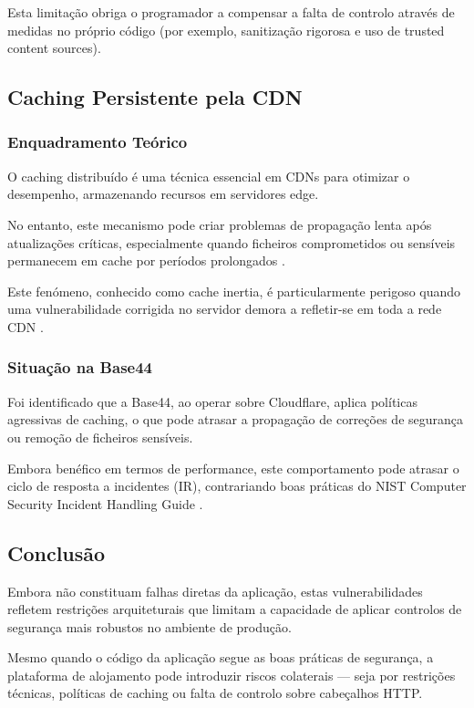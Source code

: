 Esta limitação obriga o programador a compensar a falta de controlo através de medidas no próprio código (por exemplo, sanitização rigorosa e uso de trusted content sources).

\subsection{Caching Persistente pela CDN}

\subsubsection{Enquadramento Teórico}

O caching distribuído é uma técnica essencial em CDNs para otimizar o desempenho, armazenando recursos em servidores edge.

No entanto, este mecanismo pode criar problemas de propagação lenta após atualizações críticas, especialmente quando ficheiros comprometidos ou sensíveis permanecem em cache por períodos prolongados \cite{ref26}.

Este fenómeno, conhecido como cache inertia, é particularmente perigoso quando uma vulnerabilidade corrigida no servidor demora a refletir-se em toda a rede CDN \cite{ref27}.

\subsubsection{Situação na Base44}

Foi identificado que a Base44, ao operar sobre Cloudflare, aplica políticas agressivas de caching, o que pode atrasar a propagação de correções de segurança ou remoção de ficheiros sensíveis.

Embora benéfico em termos de performance, este comportamento pode atrasar o ciclo de resposta a incidentes (IR), contrariando boas práticas do NIST Computer Security Incident Handling Guide \cite{ref28}.

\subsection{Conclusão}

Embora não constituam falhas diretas da aplicação, estas vulnerabilidades refletem restrições arquiteturais que limitam a capacidade de aplicar controlos de segurança mais robustos no ambiente de produção.

Mesmo quando o código da aplicação segue as boas práticas de segurança, a plataforma de alojamento pode introduzir riscos colaterais — seja por restrições técnicas, políticas de caching ou falta de controlo sobre cabeçalhos HTTP.

